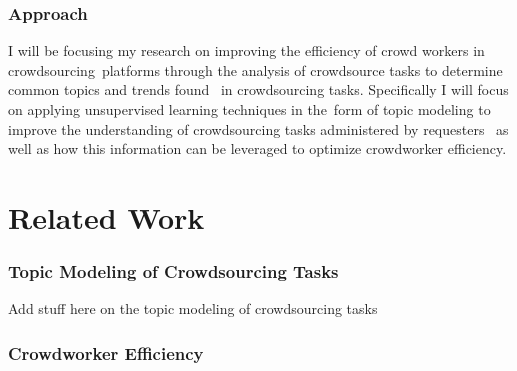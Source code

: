 \documentclass[letterpaper,12pt]{article}
\begin{document}
\subsection{Approach}
I will be focusing my research on improving the efficiency of crowd workers in crowdsourcing\
platforms through the analysis of crowdsource tasks to determine common topics and trends found \
in crowdsourcing tasks. Specifically I will focus on applying unsupervised learning techniques in the\
form of topic modeling to improve the understanding of crowdsourcing tasks administered by requesters \ 
as well as how this information can be leveraged to optimize crowdworker efficiency. 

\chapter{Related Work}

\subsection{Topic Modeling of Crowdsourcing Tasks}
Add stuff here on the topic modeling of crowdsourcing tasks

\subsection{Crowdworker Efficiency}
\end{document}
